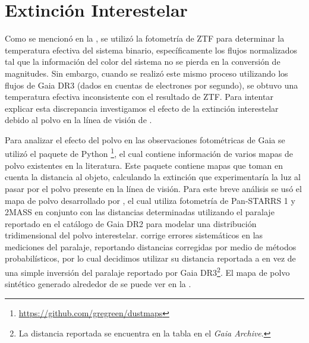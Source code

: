 \section{Extinción Interestelar}

Como se mencionó en la
, se
utilizó la fotometría de ZTF para determinar la temperatura efectiva del sistema
binario, específicamente los flujos normalizados tal que la información del
color del sistema no se pierda en la conversión de magnitudes. Sin embargo,
cuando se realizó este mismo proceso utilizando los flujos de Gaia DR3 (dados en
cuentas de electrones por segundo), se obtuvo una temperatura efectiva
inconsistente con el resultado de ZTF. Para intentar explicar esta discrepancia
investigamos el efecto de la extinción interestelar debido al polvo en la línea
de visión de \atoObjIdNoSpace.

Para analizar el efecto del polvo en las observaciones fotométricas de Gaia se
utilizó el paquete de Python
\footnote{\url{https://github.com/gregreen/dustmaps}}, el cual
contiene información de varios mapas de polvo existentes en la literatura. Este
paquete contiene mapas que toman en cuenta la distancia al objeto, calculando
la extinción que experimentaría la luz al pasar por el polvo presente en la
línea de visión. Para este breve análisis se usó el mapa de polvo desarrollado
por , el cual utiliza
fotometría de Pan-STARRS 1 y 2MASS en conjunto con las distancias determinadas
utilizando el paralaje reportado en el catálogo de Gaia DR2 para modelar una
distribución tridimensional del polvo interestelar.
 corrige errores
sistemáticos en las mediciones del paralaje, reportando distancias corregidas
por medio de métodos probabilísticos, por lo cual decidimos utilizar su
distancia reportada a \atoObjId en vez de una simple inversión del paralaje
reportado por Gaia DR3\footnote{La distancia reportada se encuentra en la tabla
 en el \textit{Gaia Archive}.}. El mapa de polvo
sintético generado alrededor de \atoObjId se puede ver en la
.

